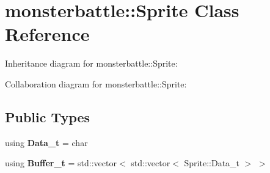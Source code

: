 \hypertarget{classmonsterbattle_1_1Sprite}{}\section{monsterbattle\+:\+:Sprite Class Reference}
\label{classmonsterbattle_1_1Sprite}


Inheritance diagram for monsterbattle\+:\+:Sprite\+:


Collaboration diagram for monsterbattle\+:\+:Sprite\+:
\subsection*{Public Types}
\begin{DoxyCompactItemize}
\item 
\mbox{\label{classmonsterbattle_1_1Sprite_ab689d38703b4790108024d2fb229d742}} 
using {\bfseries Data\+\_\+t} = char
\item 
\mbox{\label{classmonsterbattle_1_1Sprite_a5dc9bf5143be61ab64eed1a16412c3da}} 
using {\bfseries Buffer\+\_\+t} = std\+::vector$<$ std\+::vector$<$ Sprite\+::\+Data\+\_\+t $>$ $>$
\end{DoxyCompactItemize}
